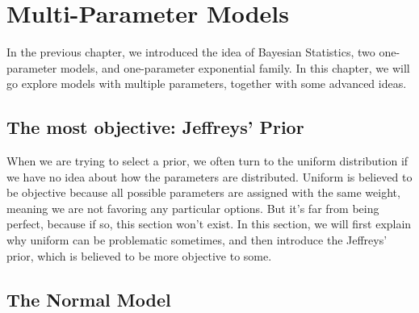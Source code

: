 \chapter{Multi-Parameter Models}
In the previous chapter, we introduced the idea of Bayesian Statistics, two one-parameter models, and one-parameter exponential family. In this chapter, we will go explore models with multiple parameters, together with some advanced ideas. 

\section{The most objective: Jeffreys' Prior}
When we are trying to select a prior, we often turn to the uniform distribution if we have no idea about how the parameters are distributed. Uniform is believed to be objective because all possible parameters are assigned with the same weight, meaning we are not favoring any particular options. But it's far from being perfect, because if so, this section won't exist. In this section, we will first explain why uniform can be problematic sometimes, and then introduce the Jeffreys' prior, which is believed to be more objective to some.

\section{The Normal Model}